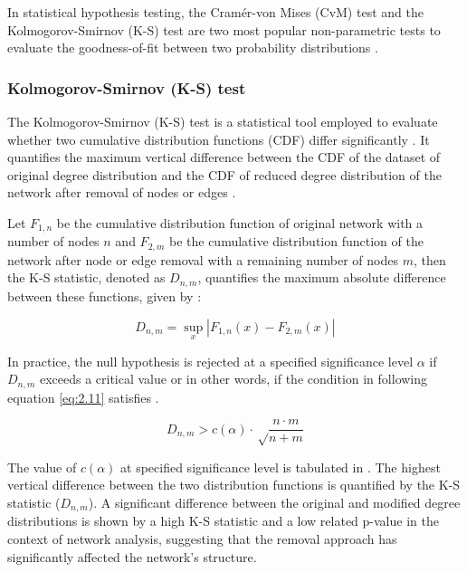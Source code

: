 \documentclass[conference]{IEEEtran} %
\begin{document}
In statistical hypothesis testing, the Cramér-von Mises (CvM) test and the Kolmogorov-Smirnov (K-S) test are two most popular non-parametric tests to evaluate the goodness-of-fit between two probability distributions \cite{arnold2011nonparametric}.

\subsubsection{Kolmogorov-Smirnov (K-S) test}

The Kolmogorov-Smirnov (K-S) test is a statistical tool employed to evaluate whether two cumulative distribution functions (CDF) differ significantly \cite{broido2019scale, arnold2011nonparametric}. It quantifies the maximum vertical difference between the CDF of the dataset of original degree distribution and the CDF of reduced degree distribution of the network after removal of nodes or edges \cite{broido2019scale, ksdegree2014,faloutsos1999structure}.

Let $F_{1,n}$ be the cumulative distribution function of original network with a number of nodes $n$ and $F_{2,m}$ be the cumulative distribution function of the network after node or edge removal with a remaining number of nodes $m$, then the K-S statistic, denoted as $D_{n,m}$, quantifies the maximum absolute difference between these functions, given by \cite{arnold2011nonparametric}:

\begin{equation}
D_{n,m} = \sup_x |F_{1,n}(x) - F_{2,m}(x)|
\end{equation}

In practice, the null hypothesis is rejected at a specified significance level $\alpha$ if $D_{n,m}$ exceeds a critical value or in other words, if the condition in following equation \ref{eq:2.11} satisfies \cite{arnold2011nonparametric}.

\begin{equation}\label{eq:2.11}
    D_{n,m} > c(\alpha) \cdot \sqrt \frac{n \cdot m}{n + m}
\end{equation}

The value of $c(\alpha)$ at specified significance level is tabulated in \cite{table_crit_values_ks}. The highest vertical difference between the two distribution functions is quantified by the K-S statistic ($D_{n,m}$). A significant difference between the original and modified degree distributions is shown by a high K-S statistic and a low related p-value in the context of network analysis, suggesting that the removal approach has significantly affected the network's structure.
\end{document}
